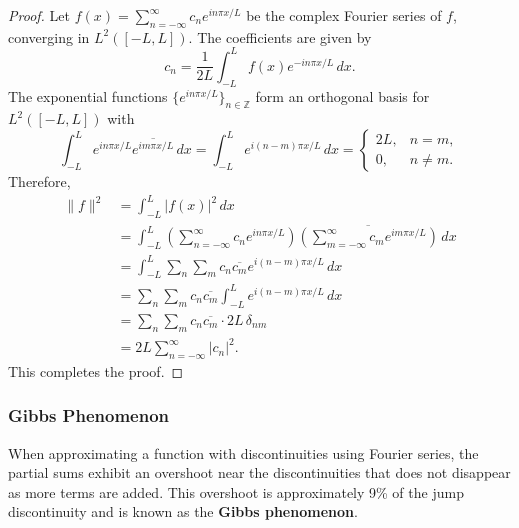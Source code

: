 \begin{proof}
    Let \( f(x) = \sum_{n=-\infty}^{\infty} c_n e^{i n \pi x / L} \) be the complex Fourier series of \( f \), converging in \( L^2([-L, L]) \).
    The coefficients are given by
    \[
        c_n = \frac{1}{2L} \int_{-L}^{L} f(x) e^{-i n \pi x / L} \, dx.
    \]
    The exponential functions \( \{e^{i n \pi x / L}\}_{n \in \mathbb{Z}} \) form an orthogonal basis for \( L^2([-L, L]) \) with
    \[
        \int_{-L}^{L} e^{i n \pi x / L} \overline{e^{i m \pi x / L}} \, dx = \int_{-L}^{L} e^{i (n-m) \pi x / L} \, dx =
        \begin{cases}
            2L, & n = m,    \\
            0,  & n \neq m.
        \end{cases}
    \]
    Therefore,
    \begin{align*}
        \|f\|^2 & = \int_{-L}^{L} |f(x)|^2 \, dx                                                                                                                                 \\
                & = \int_{-L}^{L} \left( \sum_{n=-\infty}^{\infty} c_n e^{i n \pi x / L} \right) \overline{ \left(\sum_{m=-\infty}^{\infty} c_m e^{i m \pi x / L} \right)} \, dx \\
                & = \int_{-L}^{L} \sum_{n} \sum_{m} c_n \overline{c_m} e^{i (n-m) \pi x / L} \, dx                                                                               \\
                & = \sum_{n} \sum_{m} c_n \overline{c_m} \int_{-L}^{L} e^{i (n-m) \pi x / L} \, dx                                                                               \\
                & = \sum_{n} \sum_{m} c_n \overline{c_m} \cdot 2L \, \delta_{nm}                                                                                                 \\
                & = 2L \sum_{n=-\infty}^{\infty} |c_n|^2.
    \end{align*}
    This completes the proof.
\end{proof}

\subsubsection{Gibbs Phenomenon}
When approximating a function with discontinuities using Fourier series, the partial sums exhibit an overshoot near the discontinuities that does not disappear as more terms are added. This overshoot is approximately 9\% of the jump discontinuity and is known as the \textbf{Gibbs phenomenon}.

